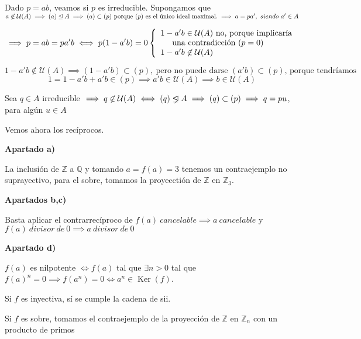 \documentclass[openany]{book}
\begin{document}
\begin{exercise}
Dado $ p = ab $, veamos si $ p $ es irreducible. Supongamos que $ a \not \in \mathcal{U}(A) \implies (a) \unlhd A \implies (a) \subset  (p)\ \text{porque $ (p) $ es el único ideal maximal.} \implies a= pa',\ siendo\ a' \in A $

$$  \implies p = ab = pa'b \iff p(1-a'b) = 0 \left\{
\begin{array}{l}
    1-a'b \in \mathcal{U}(A) \text{ no, porque implicaría}\\ \hspace{5mm} \text{una contradicción } (p=0) \\
    1-a'b \not \in \mathcal{U}(A)
\end{array}
\right. $$

$$ 1-a'b \not \in \mathcal{U}(A) \implies (1-a'b) \subset (p),\ \text{pero no puede darse $(a'b) \subset (p)$, porque tendríamos }$$
$$ 1 = 1-a'b+a'b \in (p) \implies a'b \in \mathcal{U}(A) \implies b \in \mathcal{U}(A)$$

Sea $ q \in A $ irreducible $ \implies q \not \in \mathcal{U}(A) \iff (q) \properideal A \implies (q) \subset (p) \implies q=pu$, para algún $ u \in A $

\hrulefill

Vemos ahora los recíprocos.

\begin{flushright}
    \textbf{Apartado a)}
\end{flushright}

La inclusión de $ \mathbb{Z} $ a $ \mathbb{Q} $ y tomando $ a = f(a) = 3 $ tenemos un contraejemplo no suprayectivo, para el sobre, tomamos la proyecctión de $ \mathbb{Z} $ en $ \mathbb{Z}_{3} $.

\begin{flushright}
    \textbf{Apartados b,c)}
\end{flushright}

Basta aplicar el contrarrecíproco de $ f(a)\ cancelable \implies a\ cancelable $ y $ f(a)\ divisor\ de\ 0 \implies a\ divisor\ de\ 0 $

\begin{flushright}
    \textbf{Apartado d)}
\end{flushright}

$ f(a) $ es nilpotente  $\iff f(a) $ tal que $ \exists n>0 $ tal que $ f(a)^{n} = 0 \implies f(a^{n}) = 0\iff a^{n} \in \operatorname{Ker}(f) $.

Si $ f $ es inyectiva, sí se cumple la cadena de sii.

Si $ f $ es sobre, tomamos el contraejemplo de la proyección de $ \mathbb{Z} $ en $ \mathbb{Z}_{n} $ con un producto de primos


\end{exercise}
\end{document}
